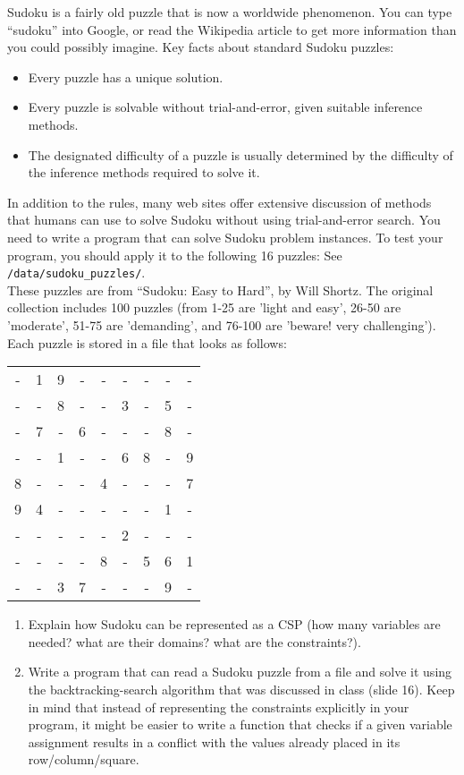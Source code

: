\documentclass[12pt]{article}
\newenvironment{problem}[2][Problem]{\begin{trivlist}
\item[\hskip \labelsep {\bfseries #1}\hskip \labelsep {\bfseries #2.}]}{\end{trivlist}}
\begin{document}
\begin{problem}{2}
	Sudoku is a fairly old puzzle that is now a worldwide phenomenon.
	You can type ``sudoku'' into Google, or read the Wikipedia article to get more information than you could possibly imagine.
	Key facts about standard Sudoku puzzles:
	\begin{itemize}
		\item Every puzzle has a unique solution.
		\item Every puzzle is solvable without trial-and-error, given suitable inference methods.
		\item The designated difficulty of a puzzle is usually determined by the difficulty of the inference methods required to solve it.
	\end{itemize}
	In addition to the rules, many web sites offer extensive discussion of methods that humans can use to solve Sudoku without using trial-and-error search.
	You need to write a program that can solve Sudoku problem instances. To test your program, you should apply it to the following 16 puzzles:
	See \texttt{/data/sudoku_puzzles/}. \\
	These puzzles are from ``Sudoku: Easy to Hard'', by Will Shortz.
	The original collection includes 100 puzzles (from 1-25 are 'light and easy', 26-50 are 'moderate', 51-75 are 'demanding', and 76-100 are 'beware! very challenging').
	Each puzzle is stored in a file that looks as follows: \\

	\begin{tabular}{ccccccccc}
		- & 1 & 9 & - & - & - & - & - & - \\
		- & - & 8 & - & - & 3 & - & 5 & - \\
		- & 7 & - & 6 & - & - & - & 8 & - \\
		- & - & 1 & - & - & 6 & 8 & - & 9 \\
		8 & - & - & - & 4 & - & - & - & 7 \\
		9 & 4 & - & - & - & - & - & 1 & - \\
		- & - & - & - & - & 2 & - & - & - \\
		- & - & - & - & 8 & - & 5 & 6 & 1 \\
		- & - & 3 & 7 & - & - & - & 9 & - \\
	\end{tabular}
	\begin{enumerate}
		\item Explain how Sudoku can be represented as a CSP (how many variables are needed? what are their domains? what are the constraints?). 
		\item Write a program that can read a Sudoku puzzle from a file and solve it using the backtracking-search algorithm that was discussed in class (slide 16).
			Keep in mind that instead of representing the constraints explicitly in your program, it might be easier to write a function that checks if a given variable assignment results in a conflict with the values already placed in its row/column/square.


\end{enumerate}
\end{problem}
\end{document}
